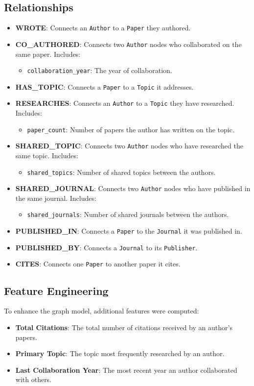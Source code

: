 \documentclass[conference, 12pt]{IEEEtran}
\begin{document}
\subsection{Relationships}
\begin{itemize}
    \item \textbf{WROTE}: Connects an \texttt{Author} to a \texttt{Paper} they authored.
    \item \textbf{CO\_AUTHORED}: Connects two \texttt{Author} nodes who collaborated on the same paper. Includes:
    \begin{itemize}
        \item \texttt{collaboration\_year}: The year of collaboration.
    \end{itemize}
    \item \textbf{HAS\_TOPIC}: Connects a \texttt{Paper} to a \texttt{Topic} it addresses.
    \item \textbf{RESEARCHES}: Connects an \texttt{Author} to a \texttt{Topic} they have researched. Includes:
    \begin{itemize}
        \item \texttt{paper\_count}: Number of papers the author has written on the topic.
    \end{itemize}
    \item \textbf{SHARED\_TOPIC}: Connects two \texttt{Author} nodes who have researched the same topic. Includes:
    \begin{itemize}
        \item \texttt{shared\_topics}: Number of shared topics between the authors.
    \end{itemize}
    \item \textbf{SHARED\_JOURNAL}: Connects two \texttt{Author} nodes who have published in the same journal. Includes:
    \begin{itemize}
        \item \texttt{shared\_journals}: Number of shared journals between the authors.
    \end{itemize}
    \item \textbf{PUBLISHED\_IN}: Connects a \texttt{Paper} to the \texttt{Journal} it was published in.
    \item \textbf{PUBLISHED\_BY}: Connects a \texttt{Journal} to its \texttt{Publisher}.
    \item \textbf{CITES}: Connects one \texttt{Paper} to another paper it cites.
\end{itemize}

\subsection{Feature Engineering}
To enhance the graph model, additional features were computed:
\begin{itemize}
    \item \textbf{Total Citations}: The total number of citations received by an author's papers.
    \item \textbf{Primary Topic}: The topic most frequently researched by an author.
    \item \textbf{Last Collaboration Year}: The most recent year an author collaborated with others.
\end{itemize}
\end{document}
